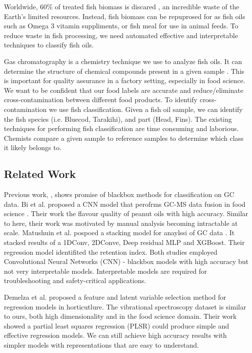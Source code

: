 \documentclass[runningheads]{llncs}
\begin{document}

Worldwide, 60\% of treated fish biomass is discared \cite{galanakis2019saving}, an incredible waste of the Earth's limited resources. 
Instead, fish biomass can be repuprosed for as fish oils such as Omega 3 vitamin suppliments, or fish meal for use in animal feeds. 
To reduce waste in fish processing, we need automated effective and interpretable techniques to classify fish oils. 

Gas chromatography \cite{eder1995gas} is a chemistry technique we use to analyze fish oils. 
It can determine the structure of chemical compounds present in a given sample \cite{restek2018high}. 
This is important for quality assurance in a factory setting, especially in food science. 
We want to be confident that our food labels are accurate and reduce/eliminate cross-contamination between different food products. 
To identify cross-contamination we use fish classification. 
Given a fish oil sample, we can identify the fish species (i.e. Bluecod, Tarakihi), and part (Head, Fins).
The existing techniques for performing fish classification are time consuming and laborious. 
Chemists compare a given sample to reference samples to determine which class it likely belongs to. 

\subsection{Related Work}

Previous work, \cite{bi2020gc,matyushin2020gas}, shows promise of blackbox methods for classification on GC data. 
Bi et al. proposed a CNN model that perofrms GC-MS data fusion in food science \cite{bi2020gc}. 
Their work the flavour quality of peanut oils with high accuracy. 
Similar to here, their work was motivated by manual analysis becoming intractable at scale. 
Matushuin et al. pospoed a stacking model for anaylssi of GC data \cite{matyushin2020gas}.
It stacked results of a 1DConv, 2DConve, Deep residual MLP and XGBoost. 
Their regression model identifited the retention index.  
Both studies employed Convolutional Neural Networks (CNN) - blackbox models with high accuracy but not very interpretable models. 
Interpretable models are required for troubleshooting and safety-critical applications. 

Demelza et al. \cite{robinson2020genetic} proposed a feature and latent variable selection method for regression models in horticutlure.
The vibrational spectroscopy dataset is similar to ours, both high dimensionality and in the food science domain. 
Their work showed a partial least squares regression (PLSR) could produce simple and effective regression models.
We can still achieve high accuracy results with simpler models with representations that are easy to understand.
\end{document}
